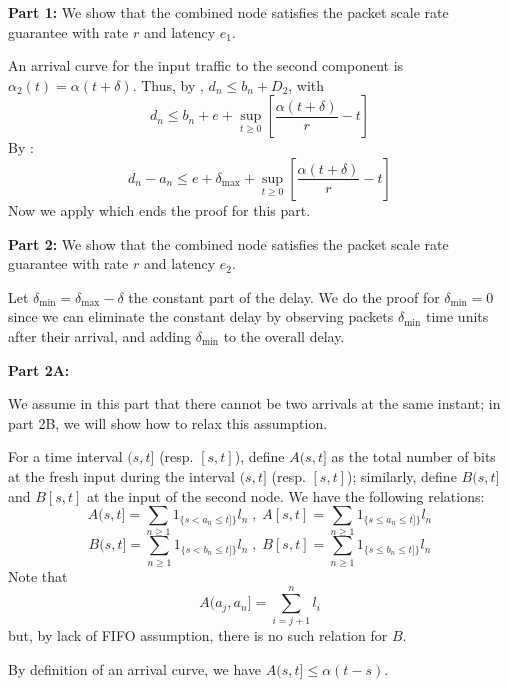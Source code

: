 \textbf{Part 1: }We show that the combined node satisfies the
packet scale rate guarantee with rate $r$ and latency $e_1$.

An arrival curve for the input traffic to the second component
is $\alpha_2(t)=\alpha(t+ \delta)$. Thus, by
, $d_n \leq b_n + D_2$, with
$$
d_n \leq b_n + e +  \sup_{t \geq 0}[ \frac{\alpha(t+
\delta)}{r}- t]
$$
By :
$$d_n -a_n \leq e+ \delta_{\max}+ \sup_{t \geq 0}[ \frac{\alpha(t+ \delta)}{r}- t]
$$
Now we apply  which ends the proof for this
part.

\textbf{Part 2: }We show that the combined node satisfies the
packet scale rate guarantee with rate $r$ and latency $e_2$.

Let $\delta_{\min}= \delta_{\max}-\delta$ the constant part of
the delay. We do the proof for $\delta_{\min}=0$ since we can
eliminate the constant delay by observing packets
$\delta_{\min}$ time units after their arrival, and adding
$\delta_{\min}$ to the overall delay.

\textbf{Part 2A:}

We assume in this part that there cannot be two arrivals at
the same instant; in part 2B, we will show how to relax this
assumption.

For a time interval $(s,t]$ (resp. $[s,t]$), define $A(s,t]$
as the total number of bits at the fresh input during the
interval $(s,t]$ (resp. $[s,t]$); similarly, define $B(s,t]$
and $B[s,t]$ at the input of the second node. We have the
following relations:
$$
A(s,t] = \sum_{n\geq 1} 1_{\{ s<a_n \leq t]\}} l_n \;,\;
 A[s,t] =
\sum_{n\geq 1} 1_{\{ s \leq a_n \leq t]\}} l_n
$$
$$
B(s,t] = \sum_{n\geq 1} 1_{\{ s<b_n \leq t]\}} l_n \;,\;
 B[s,t] =
\sum_{n\geq 1} 1_{\{ s \leq b_n \leq t]\}} l_n
$$
Note that
$$A(a_j,a_n]=\sum_{i=j+1}^n l_i$$
but, by lack of FIFO assumption, there is no such relation for
$B$.


By definition of an arrival curve, we have $A(s,t] \leq
\alpha(t-s)$.

